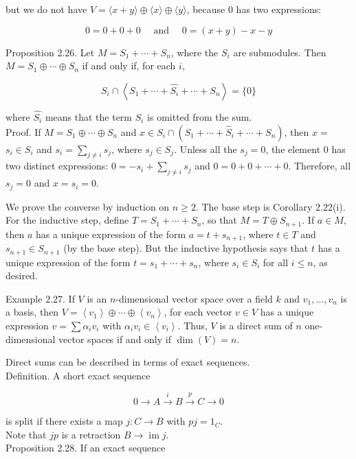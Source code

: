 \documentclass[10pt]{article}
\begin{document}
but we do not have $V=\langle x+y\rangle \oplus\langle x\rangle \oplus\langle y\rangle$, because 0 has two expressions:

$$
0=0+0+0 \quad \text { and } \quad 0=(x+y)-x-y
$$

Proposition 2.26. Let $M=S_{1}+\cdots+S_{n}$, where the $S_{i}$ are submodules. Then $M=S_{1} \oplus \cdots \oplus S_{n}$ if and only if, for each $i$,

$$
S_{i} \cap\left\langle S_{1}+\cdots+\widehat{S_{i}}+\cdots+S_{n}\right\rangle=\{0\}
$$

where $\widehat{S_{i}}$ means that the term $S_{i}$ is omitted from the sum.\\
Proof. If $M=S_{1} \oplus \cdots \oplus S_{n}$ and $x \in S_{i} \cap\left(S_{1}+\cdots+\widehat{S}_{i}+\cdots+S_{n}\right)$, then $x=$ $s_{i} \in S_{i}$ and $s_{i}=\sum_{j \neq i} s_{j}$, where $s_{j} \in S_{j}$. Unless all the $s_{j}=0$, the element 0 has two distinct expressions: $0=-s_{i}+\sum_{j \neq i} s_{j}$ and $0=0+0+\cdots+0$. Therefore, all $s_{j}=0$ and $x=s_{i}=0$.

We prove the converse by induction on $n \geq 2$. The base step is Corollary 2.22(i). For the inductive step, define $T=S_{1}+\cdots+S_{n}$, so that $M=T \oplus S_{n+1}$. If $a \in M$, then $a$ has a unique expression of the form $a=t+s_{n+1}$, where $t \in T$ and $s_{n+1} \in S_{n+1}$ (by the base step). But the inductive hypothesis says that $t$ has a unique expression of the form $t=s_{1}+\cdots+s_{n}$, where $s_{i} \in S_{i}$ for all $i \leq n$, as desired.

Example 2.27. If $V$ is an $n$-dimensional vector space over a field $k$ and $v_{1}, \ldots, v_{n}$ is a basis, then $V=\left\langle v_{1}\right\rangle \oplus \cdots \oplus\left\langle v_{n}\right\rangle$, for each vector $v \in V$ has a unique expression $v=\sum \alpha_{i} v_{i}$ with $\alpha_{i} v_{i} \in\left\langle v_{i}\right\rangle$. Thus, $V$ is a direct sum of $n$ one-dimensional vector spaces if and only if $\operatorname{dim}(V)=n$.

Direct sums can be described in terms of exact sequences.\\
Definition. A short exact sequence

$$
0 \rightarrow A \xrightarrow{i} B \xrightarrow{p} C \rightarrow 0
$$

is split if there exists a map $j: C \rightarrow B$ with $p j=1_{C}$.\\
Note that $j p$ is a retraction $B \rightarrow \operatorname{im} j$.\\
Proposition 2.28. If an exact sequence
\end{document}
